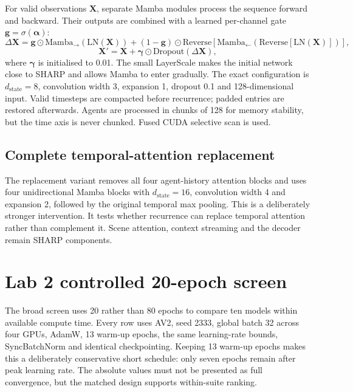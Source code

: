 For valid observations $\mathbf{X}$, separate Mamba modules process the sequence forward and backward. Their outputs are combined with a learned per-channel gate $\mathbf{g}=\sigma(\boldsymbol{\alpha})$:
\begin{equation}
    \Delta\mathbf{X}=\mathbf{g}\odot \mathrm{Mamba}_{\rightarrow}(\mathrm{LN}(\mathbf{X}))
    +(1-\mathbf{g})\odot\mathrm{Reverse}\left[
    \mathrm{Mamba}_{\leftarrow}(\mathrm{Reverse}[\mathrm{LN}(\mathbf{X})])
    \right],
\end{equation}
\begin{equation}
    \mathbf{X}'=\mathbf{X}+\boldsymbol{\gamma}\odot
    \mathrm{Dropout}(\Delta\mathbf{X}),
    \label{eq:residualmamba}
\end{equation}
where $\boldsymbol{\gamma}$ is initialised to 0.01. The small LayerScale makes the initial network close to SHARP and allows Mamba to enter gradually. The exact configuration is $d_{\mathrm{state}}=8$, convolution width 3, expansion 1, dropout 0.1 and 128-dimensional input. Valid timesteps are compacted before recurrence; padded entries are restored afterwards. Agents are processed in chunks of 128 for memory stability, but the time axis is never chunked. Fused CUDA selective scan is used.

\subsection{Complete temporal-attention replacement}

The replacement variant removes all four agent-history attention blocks and uses four unidirectional Mamba blocks with $d_{\mathrm{state}}=16$, convolution width 4 and expansion 2, followed by the original temporal max pooling. This is a deliberately stronger intervention. It tests whether recurrence can replace temporal attention rather than complement it. Scene attention, context streaming and the decoder remain SHARP components.

\section{Lab 2 controlled 20-epoch screen}

The broad screen uses 20 rather than 80 epochs to compare ten models within available compute time. Every row uses AV2, seed 2333, global batch 32 across four GPUs, AdamW, 13 warm-up epochs, the same learning-rate bounds, SyncBatchNorm and identical checkpointing. Keeping 13 warm-up epochs makes this a deliberately conservative short schedule: only seven epochs remain after peak learning rate. The absolute values must not be presented as full convergence, but the matched design supports within-suite ranking.

